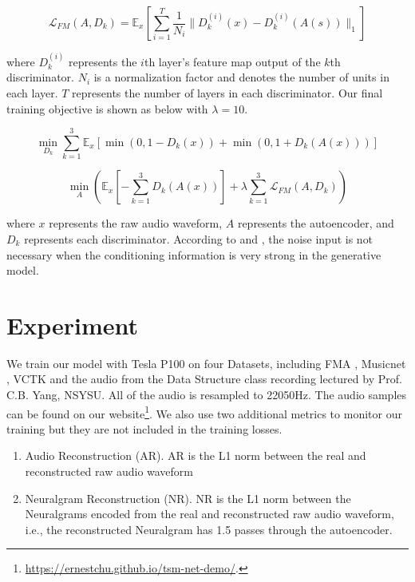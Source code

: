 \documentclass[12pt]{article}
\begin{document}
\begin{equation}
  \mathcal{L}_{FM}\left( A, D_k\right) =
  \mathbb{E}_x\left[\sum_{i=1}^T \frac{1}{N_i}
  \lVert D_k^{(i)}(x) - D_k^{(i)}(A(s))\rVert_1
  \right]
\end{equation}

where $D_k^{(i)}$ represents the $i$th layer's feature map output of the $k$th discriminator. $N_i$ is a normalization factor and denotes the number of units in each layer. $T$ represents the number of layers in each discriminator. Our final training objective is shown as below with $\lambda = 10$.

\begin{equation}
\min_{D_k}\sum_{k=1}^3\mathbb{E}_x\left[
  \min\left( 0, 1 - D_k\left( x\right)\right) +
  \min\left( 0, 1 + D_k\left( A\left( x\right)\right)\right)
\right]
\end{equation}

\begin{equation}
\min_{A}\left(
  \mathbb{E}_x\left[-\sum_{k=1}^3D_k\left( A\left( x \right)\right)\right] +
  \lambda\sum_{k=1}^3\mathcal{L}_{FM}\left( A, D_k\right)
\right)
\end{equation}

where $x$ represents the raw audio waveform, $A$ represents the autoencoder, and $D_k$ represents each discriminator. According to \cite{mat16} and \cite{iso17}, the noise input is not necessary when the conditioning information is very strong in the generative model.

\section{Experiment}
We train our model with Tesla P100 on four Datasets, including FMA \cite{kir16}, Musicnet \cite{joh18}, VCTK \cite{yam19} and the audio from the Data Structure class recording \cite{chu21} lectured by Prof. C.B. Yang, NSYSU. All of the audio is resampled to 22050Hz. The audio samples can be found on our website\footnote{\url{https://ernestchu.github.io/tsm-net-demo/}.}. We also use two additional metrics to monitor our training but they are not included in the training losses.
\begin{enumerate}
  \item{Audio Reconstruction (AR). AR is the L1 norm between the real and reconstructed raw audio waveform}
  \item{Neuralgram Reconstruction (NR). NR is the L1 norm between the Neuralgrams encoded from the real and reconstructed raw audio waveform, i.e., the reconstructed Neuralgram has 1.5 passes through the autoencoder.}
\end{enumerate}
\end{document}
